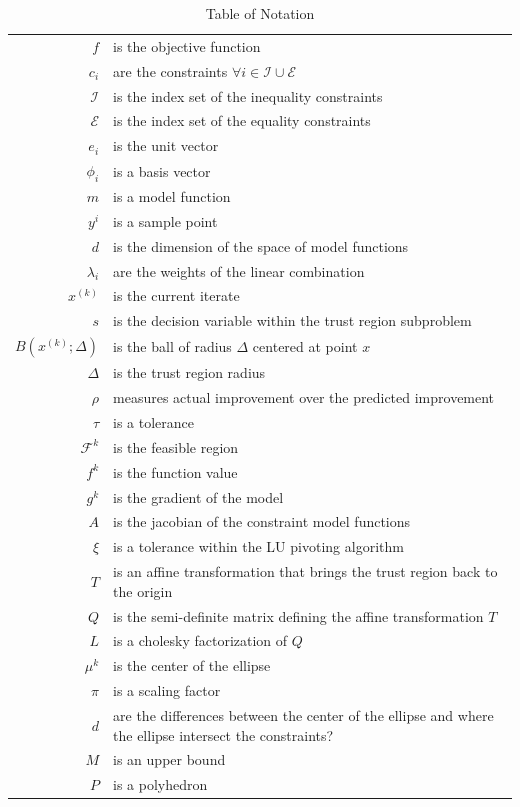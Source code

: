 \documentclass{article}
\begin{document}
\begin{table}\caption{Table of Notation}
\begin{center}
\begin{tabular}{r p{10cm} }
$f$ & is the objective function \\
$c_i$ & are the constraints $\forall i \in \mathcal{I} \cup \mathcal{E} $ \\
$\mathcal{I}$ & is the index set of the inequality constraints \\
$\mathcal{E}$ & is the index set of the equality constraints \\
$e_i$ & is the unit vector \\
$\phi_i$ & is a basis vector \\
$m$ & is a model function \\
$y^i$ & is a sample point \\
$d$ & is the dimension of the space of model functions \\
$\lambda_i$ & are the weights of the linear combination \\
$x^{(k)}$ & is the current iterate \\
$s$ & is the decision variable within the trust region subproblem \\
$B(x^{(k)}; \Delta)$ & is the ball of radius $\Delta$ centered at point $x$ \\
$\Delta$ & is the trust region radius \\
$\rho$ & measures actual improvement over the predicted improvement \\
$\tau$ & is a tolerance \\
$\mathcal{F}^k$ & is the feasible region \\
$f^k$ & is the function value \\
$g^k$ & is the gradient of the model \\
$A$ & is the jacobian of the constraint model functions \\
$\xi$ & is a tolerance within the LU pivoting algorithm \\
$T$ & is an affine transformation that brings the trust region back to the origin \\
$Q$ & is the semi-definite matrix defining the affine transformation $T$ \\
$L$ & is a cholesky factorization of $Q$ \\
$\mu^k$ & is the center of the ellipse \\
$\pi$ & is a scaling factor \\
$d$ & are the differences between the center of the ellipse and where the ellipse intersect the constraints? \\
$M$ & is an upper bound \\
$P$ & is a polyhedron \\
\end{tabular}
\end{center}
\label{tab:TableOfNotation}
\end{table}
\end{document}
